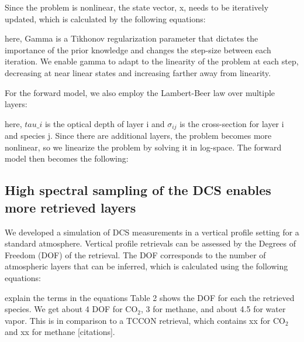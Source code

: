 \documentclass[amt, manuscript]{copernicus}
\begin{document}
Since the problem is nonlinear, the state vector, x, needs to be iteratively updated, which is calculated by the following equations:

here, Gamma is a Tikhonov regularization parameter that dictates the importance of the prior knowledge and changes the step-size between each iteration. We enable gamma to adapt to the linearity of the problem at each step, decreasing at near linear states and increasing farther away from linearity.

For the forward model, we also employ the Lambert-Beer law over multiple layers:

here, $tau\_i$ is the optical depth of layer i and  $\sigma_{ij}$ is the cross-section for layer i and species j. Since there are additional layers, the problem becomes more nonlinear, so we linearize the problem by solving it in log-space. The forward model then becomes the following:

\subsection{High spectral sampling of the DCS enables more retrieved layers }
We developed a simulation of DCS measurements in a vertical profile setting for a standard atmosphere. Vertical profile retrievals can be assessed by the Degrees of Freedom (DOF) of the retrieval. The DOF corresponds to the number of atmospheric layers that can be inferred, which is calculated using the following equations:

explain the terms in the equations
Table 2 shows the DOF for each the retrieved species. We get about 4 DOF for CO$_2$, 3 for methane, and about 4.5 for water vapor. This is in comparison to a TCCON retrieval, which contains xx for CO$_2$ and xx for methane [citations]. 
\end{document}
